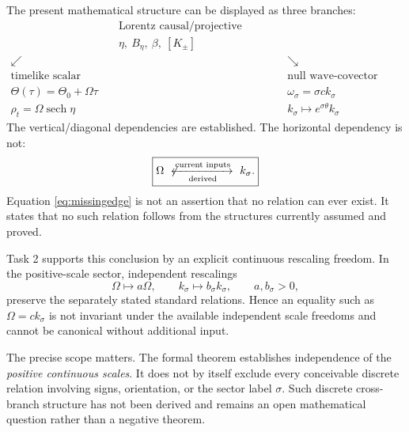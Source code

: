 \documentclass[11pt,a4paper]{article}
\newcommand{\sech}{\operatorname{sech}}
\begin{document}
The present mathematical structure can be displayed as three branches:
\begin{equation}
\boxed{
\begin{array}{ccc}
& \text{Lorentz causal/projective geometry} & \\
& \eta,\ B_\eta,\ \beta,\ [K_\pm] & \\
\swarrow & & \searrow\\[-0.3em]
\text{timelike scalar phase} & & \text{null wave-covector sector}\\
\Theta(\tau)=\Theta_0+\Omega\tau & & \omega_\sigma=\sigma ck_\sigma\\
\rho_t=\Omega\sech\eta & & k_\sigma\mapsto e^{\sigma\theta}k_\sigma
\end{array}}
\label{eq:branches}
\end{equation}
The vertical/diagonal dependencies are established.  The horizontal dependency is not:
\begin{equation}
 \boxed{\Omega\ \not\xleftrightarrow[\text{derived}]{\text{current inputs}}\ k_\sigma.}
\label{eq:missingedge}
\end{equation}
Equation \eqref{eq:missingedge} is not an assertion that no relation can ever exist.  It states that no such relation follows from the structures currently assumed and proved.

Task 2 supports this conclusion by an explicit continuous rescaling freedom.  In the positive-scale sector, independent rescalings
\begin{equation}
 \Omega\mapsto a\Omega,
 \qquad
 k_\sigma\mapsto b_\sigma k_\sigma,
 \qquad a,b_\sigma>0,
\end{equation}
preserve the separately stated standard relations.  Hence an equality such as $\Omega=ck_\sigma$ is not invariant under the available independent scale freedoms and cannot be canonical without additional input.

The precise scope matters.  The formal theorem establishes independence of the \emph{positive continuous scales}.  It does not by itself exclude every conceivable discrete relation involving signs, orientation, or the sector label $\sigma$.  Such discrete cross-branch structure has not been derived and remains an open mathematical question rather than a negative theorem.
\end{document}
